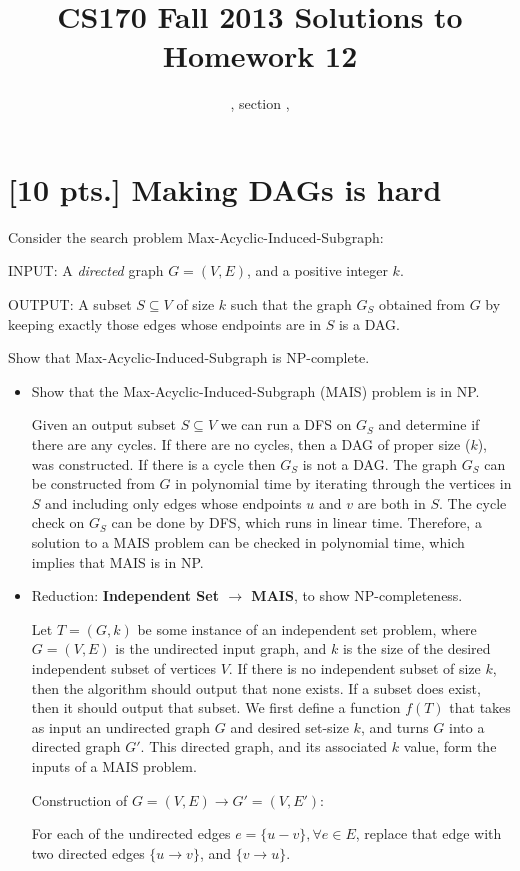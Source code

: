 \documentclass[11pt]{article}
\title{CS170  Fall 2013 Solutions to Homework 12}
\author{\Name, section \Sec, \texttt{\Login}}
\begin{document}
\maketitle

\section{[10 pts.] Making DAGs is hard}

Consider the search problem Max-Acyclic-Induced-Subgraph: 

INPUT: A \emph{directed} graph $G=(V,E)$, and a positive integer $k$.

OUTPUT: A subset $S\subseteq V$ of size $k$ such that the graph $G_S$ obtained
from $G$ by keeping exactly those edges whose endpoints are in $S$ is a 
DAG.

Show that Max-Acyclic-Induced-Subgraph is NP-complete.

\begin{itemize}

\item Show that the Max-Acyclic-Induced-Subgraph (MAIS) problem is in NP.

  Given an output subset $S \subseteq V$ we can run a DFS on $G_S$ and determine if
  there are any cycles. If there are no cycles, then a DAG of proper size ($k$),
  was constructed. If there is a cycle then $G_S$ is not a DAG. The graph $G_S$ 
  can be constructed from $G$ in polynomial time by iterating through the vertices in
  $S$ and including only edges whose endpoints $u$ and $v$ are both in $S$. The
  cycle check on $G_S$ can be done by DFS, which runs in linear time. Therefore,
  a solution to a MAIS problem can be checked in polynomial time, which implies that
  MAIS is in NP.
  
\item Reduction:  {\bf Independent Set  $\rightarrow$ MAIS},
  to show NP-completeness.
  
  Let $T=(G,k)$ be some instance of an independent set problem, where
  $G=(V,E)$ is the undirected input graph, and $k$ is the size of the desired independent subset 
  of vertices $V$. If there is no independent subset of size $k$, then the algorithm
  should output that none exists. If a subset does exist, then it should output that
  subset. 
  We first define a function $f(T)$ 
  that takes as input an undirected graph $G$ and desired set-size $k$,
  and turns $G$ into a directed graph $G'$. This directed graph, and its associated
  $k$ value, form the inputs of a MAIS problem. 

  Construction of $G=(V,E)\rightarrow G'=(V,E')$: 

  For each of the undirected edges $e = \{u-v\}, \forall e\in E$, replace that edge
  with two directed edges $\{u \rightarrow v\}$, and $\{v \rightarrow u\}$.  
   
  
\end{itemize}
\end{document}
